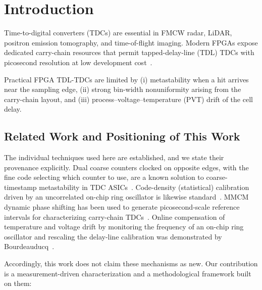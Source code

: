 \documentclass[journal]{IEEEtran}
\begin{document}
\section{Introduction}

Time-to-digital converters (TDCs) are essential in FMCW radar, LiDAR,
positron emission tomography, and time-of-flight imaging. Modern FPGAs expose
dedicated carry-chain resources that permit tapped-delay-line (TDL) TDCs with
picosecond resolution at low development cost~\cite{song,wu,charbon}.

Practical FPGA TDL-TDCs are limited by (i) metastability when a hit arrives
near the sampling edge, (ii) strong bin-width nonuniformity arising from the
carry-chain layout, and (iii) process--voltage--temperature (PVT) drift of the
cell delay.

\subsection{Related Work and Positioning of This Work}

The individual techniques used here are established, and we state their
provenance explicitly.
Dual coarse counters clocked on opposite edges, with the fine code selecting
which counter to use, are a known solution to coarse-timestamp
metastability in TDC ASICs~\cite{atlasmdt}.
Code-density (statistical) calibration driven by an uncorrelated on-chip ring
oscillator is likewise standard~\cite{calibreview,wang19ps}.
MMCM dynamic phase shifting has been used to generate picosecond-scale
reference intervals for characterizing carry-chain TDCs~\cite{sensors2026}.
Online compensation of temperature and voltage drift by monitoring the
frequency of an on-chip ring oscillator and rescaling the delay-line
calibration was demonstrated by Bourdeauducq~\cite{bourdeauducq}.

Accordingly, this work does not claim these mechanisms as new. Our
contribution is a measurement-driven characterization and a methodological
framework built on them:
\end{document}
